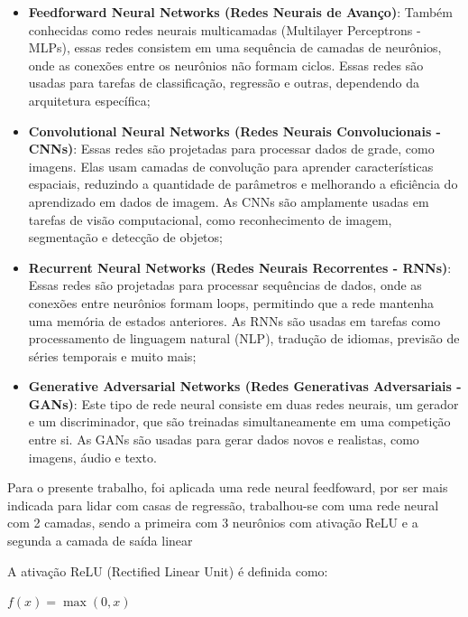 \begin{itemize}
    \item \textbf{Feedforward Neural Networks (Redes Neurais de Avanço)}:
    Também conhecidas como redes neurais multicamadas (Multilayer Perceptrons - MLPs), essas redes consistem em uma sequência de camadas de neurônios, onde as conexões entre os neurônios não formam ciclos. Essas redes são usadas para tarefas de classificação, regressão e outras, dependendo da arquitetura específica\cite{enwiki:1216115889};
    
    \item \textbf{Convolutional Neural Networks (Redes Neurais Convolucionais - CNNs)}:
    Essas redes são projetadas para processar dados de grade, como imagens. Elas usam camadas de convolução para aprender características espaciais, reduzindo a quantidade de parâmetros e melhorando a eficiência do aprendizado em dados de imagem. As CNNs são amplamente usadas em tarefas de visão computacional, como reconhecimento de imagem, segmentação e detecção de objetos\cite{gu2018recent};
    
    \item \textbf{Recurrent Neural Networks (Redes Neurais Recorrentes - RNNs)}:
    Essas redes são projetadas para processar sequências de dados, onde as conexões entre neurônios formam loops, permitindo que a rede mantenha uma memória de estados anteriores. As RNNs são usadas em tarefas como processamento de linguagem natural (NLP), tradução de idiomas, previsão de séries temporais e muito mais\cite{RNN};
    
    \item \textbf{Generative Adversarial Networks (Redes Generativas Adversariais - GANs)}:
    Este tipo de rede neural consiste em duas redes neurais, um gerador e um discriminador, que são treinadas simultaneamente em uma competição entre si. As GANs são usadas para gerar dados novos e realistas, como imagens, áudio e texto\cite{wang2017generative}.
\end{itemize}

Para o presente trabalho, foi aplicada uma rede neural feedfoward, por ser mais indicada para lidar com casas de regressão, trabalhou-se com uma rede neural com 2 camadas, sendo a primeira com 3 neurônios com ativação ReLU e a segunda a camada de saída linear

A ativação ReLU (Rectified Linear Unit) é definida como:

\begin{center}
\centering
$f(x) = \max(0, x)$
\end{center}

